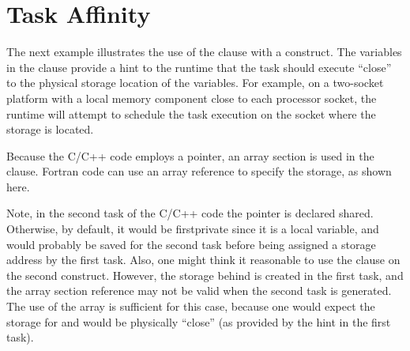 \section{Task Affinity}
\label{sec: task_affinity}

The next example illustrates the use of the 
clause with a  construct.
The variables in the  clause provide a
hint to the runtime that the task should execute
``close'' to the physical storage location of the variables. For example,
on a two-socket platform with a local memory component
close to each processor socket, the runtime will attempt to
schedule the task execution on the socket where the storage is located.

Because the C/C++ code employs a pointer, an array section is used in
the  clause.
Fortran code can use an array reference to specify the storage, as
shown here.

Note, in the second task of the C/C++ code the  pointer is declared
shared.  Otherwise, by default, it would be firstprivate since it is a local
variable, and would probably be saved for the second task before being assigned
a storage address by the first task.  Also, one might think it reasonable to use
the  clause  on the second  construct.
However, the storage behind  is created in the first task, and the 
array section reference may not be valid when the second task is generated.
The use of the  array is sufficient for this case, because one
would expect the storage for  and  would be physically ``close''
(as provided by the hint in the first task).



